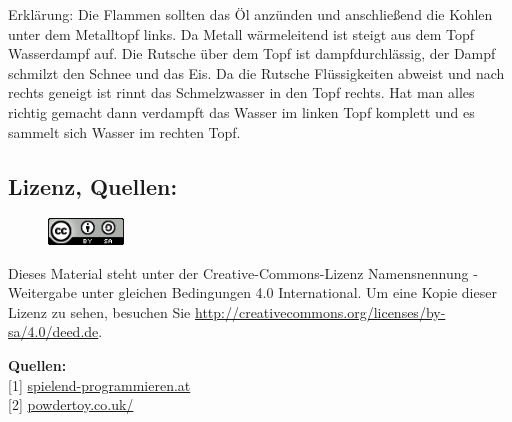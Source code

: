 Erklärung: Die Flammen sollten das Öl anzünden und anschließend die Kohlen unter dem Metalltopf links. Da Metall wärmeleitend ist steigt aus dem Topf Wasserdampf auf. Die Rutsche über dem Topf ist dampfdurchlässig, der Dampf schmilzt den Schnee und das Eis. Da die Rutsche Flüssigkeiten abweist und nach rechts geneigt ist rinnt das Schmelzwasser in den Topf rechts. Hat man alles richtig gemacht dann verdampft das Wasser im linken Topf komplett und es sammelt sich Wasser im rechten Topf.

\subsection*{Lizenz, Quellen:}
\begin{figure}
\includegraphics[width=2cm]{powdertoytutorial/ccbysa88x31.png}
\end{figure}
Dieses Material steht unter der Creative-Commons-Lizenz Namensnennung - Weitergabe unter gleichen Bedingungen 4.0 International. Um eine Kopie dieser Lizenz zu sehen, besuchen Sie \url{http://creativecommons.org/licenses/by-sa/4.0/deed.de}.

\textbf{Quellen:} \\
{[}1{]} \href{http://spielend-programmieren.at}{spielend-programmieren.at} \\
{[}2{]} \href{http://powdertoy.co.uk/}{powdertoy.co.uk/} \\
